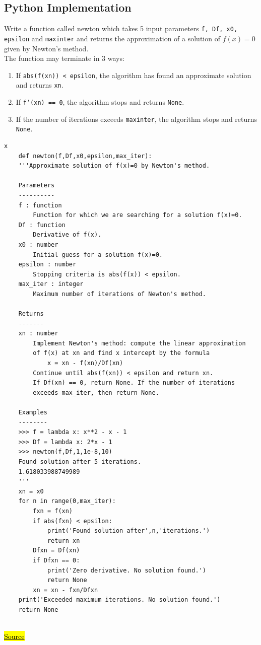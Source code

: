\documentclass[a4paper, 12pt, reqno]{article}
\begin{document}
\subsection{Python Implementation}
Write a function called newton which takes 5 input parameters \texttt{f, Df, x0, epsilon} and \texttt{maxinter} 
and returns the approximation of a solution of $f(x)=0$ given by Newton's method. \\
The function may terminate in 3 ways:
\begin{enumerate}
    \item If \texttt{abs(f(xn)) < epsilon}, the algorithm has found an approximate solution and returns \texttt{xn}.
    \item If \texttt{f'(xn) == 0}, the algorithm stops and returns \texttt{None}.
    \item If the number of iterations exceeds \texttt{maxinter}, the algorithm stops and returns \texttt{None}.
\end{enumerate}

\begin{lstlisting}[frame=single]  % Start your code-block
    x
    def newton(f,Df,x0,epsilon,max_iter):
    '''Approximate solution of f(x)=0 by Newton's method.

    Parameters
    ----------
    f : function
        Function for which we are searching for a solution f(x)=0.
    Df : function
        Derivative of f(x).
    x0 : number
        Initial guess for a solution f(x)=0.
    epsilon : number
        Stopping criteria is abs(f(x)) < epsilon.
    max_iter : integer
        Maximum number of iterations of Newton's method.

    Returns
    -------
    xn : number
        Implement Newton's method: compute the linear approximation
        of f(x) at xn and find x intercept by the formula
            x = xn - f(xn)/Df(xn)
        Continue until abs(f(xn)) < epsilon and return xn.
        If Df(xn) == 0, return None. If the number of iterations
        exceeds max_iter, then return None.

    Examples
    --------
    >>> f = lambda x: x**2 - x - 1
    >>> Df = lambda x: 2*x - 1
    >>> newton(f,Df,1,1e-8,10)
    Found solution after 5 iterations.
    1.618033988749989
    '''
    xn = x0
    for n in range(0,max_iter):
        fxn = f(xn)
        if abs(fxn) < epsilon:
            print('Found solution after',n,'iterations.')
            return xn
        Dfxn = Df(xn)
        if Dfxn == 0:
            print('Zero derivative. No solution found.')
            return None
        xn = xn - fxn/Dfxn
    print('Exceeded maximum iterations. No solution found.')
    return None
    
    \end{lstlisting}
\href{https://personal.math.ubc.ca/~pwalls/math-python/roots-optimization/newton/}{\hl{Source}}
\end{document}
